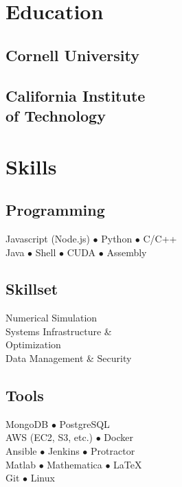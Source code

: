 \documentclass[]{yubo-resume-openfont}
\begin{document}
\begin{minipage}[t]{0.33\textwidth}


\section{Education}
    \subsection[Cornell]{Cornell University}
    \sectionsep
    \subsection[CIT]{California Institute\\
        of Technology}
\sectionsep


\section{Skills}
    \subsection{Programming}
    Javascript (Node.js) $\bullet$ Python $\bullet$ C/C++\\
    Java $\bullet$ Shell $\bullet$ CUDA $\bullet$ Assembly\\
    \sectionsep
    \subsection{Skillset}
    Numerical Simulation\\
    Systems Infrastructure \&\\
        \tab Optimization\\
    Data Management \& Security
    \sectionsep
    \subsection{Tools}
    MongoDB $\bullet$ PostgreSQL \\
    AWS (EC2, S3, etc.) $\bullet$ Docker\\
    Ansible $\bullet$ Jenkins $\bullet$ Protractor\\
    Matlab $\bullet$ Mathematica $\bullet$ \LaTeX\\
    Git $\bullet$ Linux\\
    \sectionsep

\end{minipage}
\end{document}

